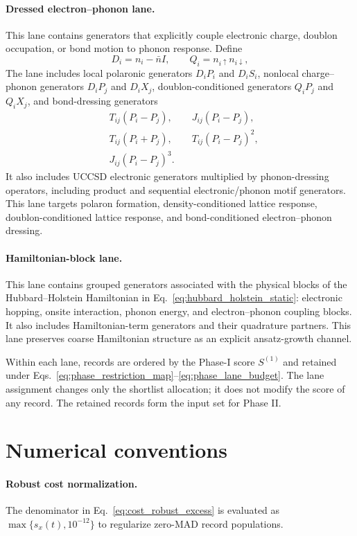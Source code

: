 \documentclass[
  reprint,
  amsmath,
  amssymb,
  aps,
  pra,
  nofootinbib,
  superscriptaddress,
  floatfix
]{revtex4-2}
\begin{document}
\paragraph*{Dressed electron--phonon lane.}
This lane contains generators that explicitly couple electronic charge, doublon occupation, or bond motion to phonon response. Define
\[
D_i=n_i-\bar n I,
\qquad
Q_i=n_{i\uparrow}n_{i\downarrow},
\]
The lane includes local polaronic generators \(D_iP_i\) and \(D_iS_i\), nonlocal charge--phonon generators \(D_iP_j\) and \(D_iX_j\), doublon-conditioned generators \(Q_iP_j\) and \(Q_iX_j\), and bond-dressing generators
\begin{align*}
&T_{ij}(P_i-P_j),
\qquad
J_{ij}(P_i-P_j),\\
&T_{ij}(P_i+P_j),
\qquad
T_{ij}(P_i-P_j)^2,\\
&J_{ij}(P_i-P_j)^3 .
\end{align*}
It also includes UCCSD electronic generators multiplied by phonon-dressing
operators, including product and sequential electronic/phonon motif generators.
This lane targets polaron formation, density-conditioned lattice response,
doublon-conditioned lattice response, and bond-conditioned electron--phonon
dressing.

\paragraph*{Hamiltonian-block lane.}
This lane contains grouped generators associated with the physical blocks of the Hubbard--Holstein Hamiltonian
in Eq.~\eqref{eq:hubbard_holstein_static}: electronic hopping, onsite
interaction, phonon energy, and electron--phonon coupling blocks. It also
includes Hamiltonian-term generators and their quadrature partners. This lane
preserves coarse Hamiltonian structure as an explicit ansatz-growth channel.

Within each lane, records are ordered by the Phase-I score \(S^{(1)}\) and retained under
Eqs.~\eqref{eq:phase_restriction_map}--\eqref{eq:phase_lane_budget}. The lane
assignment changes only the shortlist allocation; it does not modify the score
of any record. The retained records form the input set for Phase II.


\section{Numerical conventions}
\label{app:numerical_conventions}

\paragraph*{Robust cost normalization.}
The denominator in Eq.~\eqref{eq:cost_robust_excess} is evaluated as
\(\max\{s_x(t),10^{-12}\}\) to regularize zero-MAD record populations.
\end{document}
